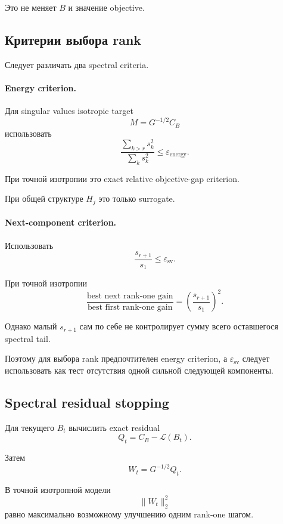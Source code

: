 Это не меняет $B$ и значение objective.

\subsection{Критерии выбора rank}

Следует различать два spectral criteria.

\paragraph{Energy criterion.}

Для singular values isotropic target
\[
    M=G^{-1/2}C_B
\]
использовать
\[
\boxed{
    \frac{
        \sum_{k>r}s_k^2
    }{
        \sum_ks_k^2
    }
    \le
    \varepsilon_{\mathrm{energy}}.
}
\]

При точной изотропии это exact relative objective-gap criterion.

При общей структуре $H_j$ это только surrogate.

\paragraph{Next-component criterion.}

Использовать
\[
\boxed{
    \frac{s_{r+1}}{s_1}
    \le
    \varepsilon_{\mathrm{sv}}.
}
\]

При точной изотропии
\[
\boxed{
    \frac{
        \text{best next rank-one gain}
    }{
        \text{best first rank-one gain}
    }
    =
    \left(
        \frac{s_{r+1}}{s_1}
    \right)^2.
}
\]

Однако малый $s_{r+1}$ сам по себе не контролирует сумму всего
оставшегося spectral tail.

Поэтому для выбора rank предпочтителен energy criterion,
а $\varepsilon_{\mathrm{sv}}$ следует использовать как тест
отсутствия одной сильной следующей компоненты.

\subsection{Spectral residual stopping}

Для текущего $B_t$ вычислить exact residual
\[
    Q_t=C_B-\mathcal L(B_t).
\]

Затем
\[
    W_t=G^{-1/2}Q_t.
\]

В точной изотропной модели
\[
\boxed{
    \|W_t\|_2^2
}
\]
равно максимально возможному улучшению одним rank-one шагом.

